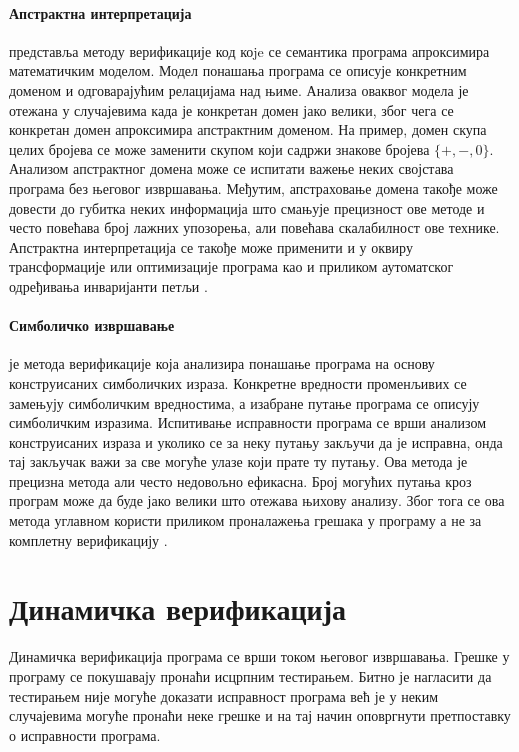 \documentclass[12pt,oneside]{memoir}
\begin{document}
\paragraph{Апстрактна интерпретација} представља методу верификације код коje се семантика програма апроксимира математичким моделом. Модел понашања програма се описује конкретним доменом и одговарајућим релацијама над њиме. Анализа оваквог модела је отежана у случајевима када је конкретан домен јако велики, због чега се конкретан домен апроксимира апстрактним доменом. На пример, домен скупа целих бројева се може заменити скупом који садржи знакове бројева $ \{+,-,0\}$. Анализом апстрактног домена може се испитати важење неких својстава програма без његовог извршавања. Међутим, апстраховање домена такође може довести до губитка неких информација што смањује прецизност ове методе и често повећава број лажних упозорења, али повећава скалабилност ове технике. Апстрактна интерпретација се такође може применити и у оквиру трансформације или оптимизације програма као и приликом аутоматског одређивања инваријанти петљи \cite{mvjphd,verif_tech}. 

\paragraph{Симболичко извршавање} је метода верификације која анализира понашање програма на основу конструисаних симболичких израза. Конкретне вредности променљивих се замењују симболичким вредностима, а изабране путање програма се описују симболичким изразима. Испитивање исправности програма се врши анализом конструисаних израза и уколико се за неку путању закључи да је исправна, онда тај закључак важи за све могуће улазе који прате ту путању. Ова метода је прецизна метода али често недовољно ефикасна. Број могућих путања кроз програм може да буде јако велики што отежава њихову анализу. Због тога се ова метода углавном користи приликом проналажења грешака у програму а не за комплетну верификацију \cite{mvjphd,symbolic_exec}.

\section{Динамичка верификација}
  Динамичка верификација програма се врши током његовог извршавања. Грешке у програму се покушавају пронаћи исцрпним тестирањем. Битно је нагласити да тестирањем није могуће доказати исправност програма већ је у неким случајевима могуће пронаћи неке грешке и на тај начин оповргнути претпоставку о исправности програма. 
  
\end{document}
